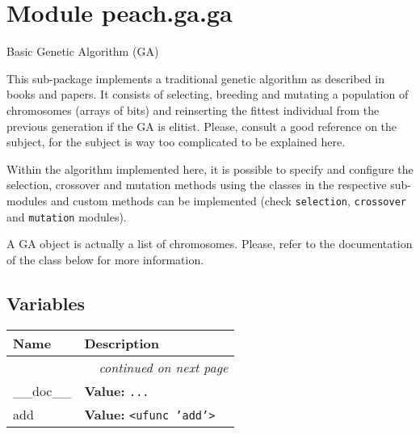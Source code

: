 %
%
%


\section{Module peach.ga.ga}

    \label{peach:ga:ga}

Basic Genetic Algorithm (GA)

This sub-package implements a traditional genetic algorithm as described in
books and papers. It consists of selecting, breeding and mutating a population
of chromosomes (arrays of bits) and reinserting the fittest individual from the
previous generation if the GA is elitist. Please, consult a good reference on
the subject, for the subject is way too complicated to be explained here.

Within the algorithm implemented here, it is possible to specify and configure
the selection, crossover and mutation methods using the classes in the
respective sub-modules and custom methods can be implemented (check
\texttt{selection}, \texttt{crossover} and \texttt{mutation} modules).

A GA object is actually a list of chromosomes. Please, refer to the
documentation of the class below for more information.


  \subsection{Variables}

\begin{longtable}{|p{}|p{}|l}
\cline{1-2}
\cline{1-2} \centering \textbf{Name} & \centering \textbf{Description}& \\
\cline{1-2}
\endhead\cline{1-2}\multicolumn{3}{r}{\small\textit{continued on next page}}\\\endfoot\cline{1-2}
\endlastfoot\raggedright \_\-\_\-d\-o\-c\-\_\-\_\- & \raggedright \textbf{Value:} 
{\tt \texttt{...}}&\\
\cline{1-2}
\raggedright a\-d\-d\- & \raggedright \textbf{Value:} 
{\tt {\textless}ufunc 'add'{\textgreater}}&\\
\cline{1-2}
\end{longtable}


